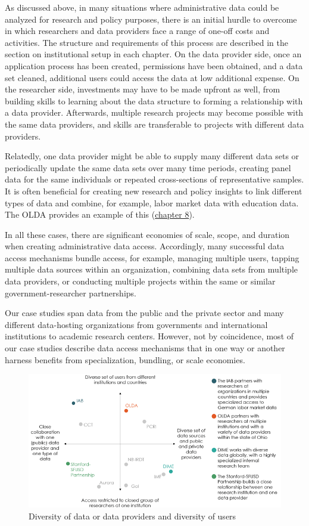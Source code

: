 \documentclass[
]{WileySix}
\begin{document}
As discussed above, in many situations where administrative data could be analyzed for research and policy purposes, there is an initial hurdle to overcome in which researchers and data providers face a range of one-off costs and activities. The structure and requirements of this process are described in the section on institutional setup in each chapter. On the data provider side, once an application process has been created, permissions have been obtained, and a data set cleaned, additional users could access the data at low additional expense. On the researcher side, investments may have to be made upfront as well, from building skills to learning about the data structure to forming a relationship with a data provider. Afterwards, multiple research projects may become possible with the same data providers, and skills are transferable to projects with different data providers.

Relatedly, one data provider might be able to supply many different data sets or periodically update the same data sets over many time periods, creating panel data for the same individuals or repeated cross-sections of representative samples. It is often beneficial for creating new research and policy insights to link different types of data and combine, for example, labor market data with education data. The OLDA provides an example of this (\protect\hyperlink{olda}{chapter 8}).

In all these cases, there are significant economies of scale, scope, and duration when creating administrative data access. Accordingly, many successful data access mechanisms bundle access, for example, managing multiple users, tapping multiple data sources within an organization, combining data sets from multiple data providers, or conducting multiple projects within the same or similar government-researcher partnerships.

Our case studies span data from the public and the private sector and many different data-hosting organizations from governments and international institutions to academic research centers. However, not by coincidence, most of our case studies describe data access mechanisms that in one way or another harness benefits from specialization, bundling, or scale economies.

\begin{figure}
\centering
\includegraphics{./assets/intro/introfigure1web.png}
\caption{\label{fig:introfig1}Diversity of data or data providers and diversity of users}
\end{figure}
\end{document}
